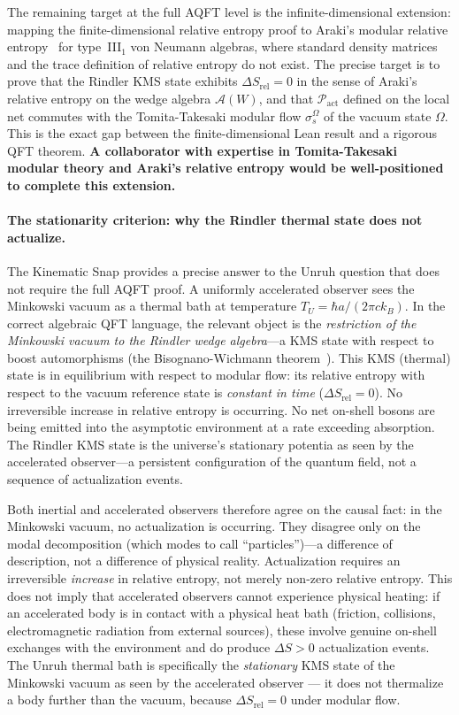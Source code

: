 \documentclass[11pt,a4paper]{article}
\theoremstyle{plain}
\theoremstyle{definition}
\theoremstyle{remark}
\newcommand{\Pact}{\mathcal{P}_{\mathrm{act}}}
\begin{document}
The remaining target at the full AQFT level is the infinite-dimensional
extension: mapping the finite-dimensional relative entropy proof to Araki's modular
relative entropy~\citep{Araki1976} for type~III$_1$ von Neumann algebras, where
standard density matrices and the trace definition of relative entropy do not exist.
The precise target is to prove that the Rindler KMS state exhibits
$\Delta S_{\mathrm{rel}} = 0$ in the sense of Araki's relative entropy on the
wedge algebra $\mathcal{A}(W)$, and that $\Pact$ defined on the local net commutes
with the Tomita-Takesaki modular flow $\sigma_s^{\Omega}$ of the vacuum state
$\Omega$. This is the exact gap between the finite-dimensional Lean result and a
rigorous QFT theorem. \textbf{A collaborator with expertise in Tomita-Takesaki
modular theory and Araki's relative entropy would be well-positioned to complete
this extension.}

\paragraph{The stationarity criterion: why the Rindler thermal state does not actualize.}
The Kinematic Snap provides a precise answer to the Unruh question that does not
require the full AQFT proof. A uniformly accelerated observer sees the Minkowski
vacuum as a thermal bath at temperature $T_U = \hbar a / (2\pi c k_B)$. In the
correct algebraic QFT language, the relevant object is the \emph{restriction of
the Minkowski vacuum to the Rindler wedge algebra}---a KMS state with respect to
boost automorphisms (the Bisognano-Wichmann theorem~\citep{BisognanoWichmann1975}).
This KMS (thermal) state is in equilibrium with respect to modular flow: its
relative entropy with respect to the vacuum reference state is
\emph{constant in time} ($\Delta S_{\mathrm{rel}} = 0$).
No irreversible increase in relative entropy is occurring. No net on-shell bosons
are being emitted into the asymptotic environment at a rate exceeding absorption.
The Rindler KMS state is the universe's stationary potentia as seen by the
accelerated observer---a persistent configuration of the quantum field, not a
sequence of actualization events.

Both inertial and accelerated observers therefore agree on the causal fact: in the
Minkowski vacuum, no actualization is occurring. They disagree only on the modal
decomposition (which modes to call ``particles'')---a difference of description,
not a difference of physical reality. Actualization requires an irreversible
\emph{increase} in relative entropy, not merely non-zero relative entropy.
This does not imply that accelerated observers cannot experience physical heating:
if an accelerated body is in contact with a physical heat bath
(friction, collisions, electromagnetic radiation from external sources),
these involve genuine on-shell exchanges with the environment and do produce
$\Delta S > 0$ actualization events. The Unruh thermal bath is
specifically the \emph{stationary} KMS state of the Minkowski vacuum
as seen by the accelerated observer --- it does not thermalize a body further
than the vacuum, because $\Delta S_{\mathrm{rel}} = 0$ under modular flow.
\end{document}
